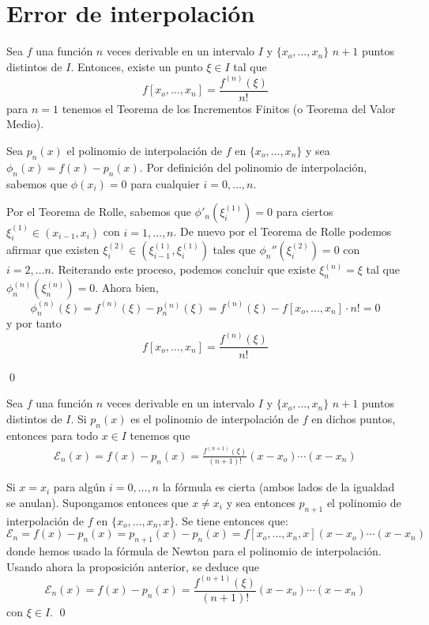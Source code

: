         \section{Error de interpolación}
        \begin{prop}
        Sea $f$ una función $n$ veces derivable en un intervalo $I$ y $\{x_o,\ldots,x_n\}$ $n+1$ puntos distintos de $I$. Entonces, existe un punto $\xi\in I$ tal que
        $$f[x_o,\ldots,x_n]=\frac{f^{(n)}(\xi)}{n!}$$
        para $n=1$ tenemos el Teorema de los Incrementos Finitos (o Teorema del Valor Medio).
        \end{prop}
        \begin{dem}
        Sea $p_n(x)$ el polinomio de interpolación de $f$ en $\{x_o,\ldots,x_n\}$ y sea $\phi_n(x)=f(x)-p_n(x)$. Por definición del polinomio de interpolación, sabemos que $\phi(x_i)=0$ para cualquier $i=0,\ldots,n$.
        
        Por el Teorema de Rolle, sabemos que $\phi'_n(\xi^{(1)}_i)=0$ para ciertos $\xi^{(1)}_i\in(x_{i-1},x_i)$ con $i=1,\ldots,n$. De nuevo por el Teorema de Rolle podemos afirmar que existen $\xi_i^{(2)}\in(\xi_{i-1}^{(1)},\xi_i^{(1)})$ tales que $\phi_n''(\xi_i^{(2)})=0$ con $i=2,\ldots n$. Reiterando este proceso, podemos concluir que existe $\xi^{(n)}_n=\xi$ tal que $\phi^{(n)}_n(\xi^{(n)}_n)=0$. Ahora bien, $$\phi^{(n)}_n(\xi)=f^{(n)}(\xi)-p^{(n)}_n(\xi)=f^{(n)}(\xi)-f[x_o,\ldots,x_n]\cdot n!=0$$
        y por tanto 
       $$f[x_o,\ldots,x_n]=\frac{f^{(n)}(\xi)}{n!}$$

        \qed\end{dem}
        \begin{teo}
         Sea $f$ una función $n$ veces derivable en un intervalo $I$ y $\{x_o,\ldots,x_n\}$ $n+1$ puntos distintos de $I$. Si $p_n(x)$ es el polinomio de interpolación de $f$ en dichos puntos, entonces para todo $x\in I$ tenemos que
         \begin{align}
         \mathcal{E}_n(x)=f(x)-p_n(x)=\frac{f^{(n+1)}(\xi)}{(n+1)!}(x-x_o)\cdots(x-x_n)
         \label{error:int}
          \end{align}
        \end{teo}
        \begin{dem}
        Si $x=x_i$ para algún $i=0,\ldots, n$ la fórmula es cierta (ambos lados de la igualdad se anulan). Supongamos entonces que $x\neq x_i$ y sea entonces $p_{n+1}$ el polinomio de interpolación de $f$ en $\{x_o,\ldots,x_n,x\}$. Se tiene entonces que:
        $$\mathcal{E}_n=f(x)-p_n(x)=p_{n+1}(x)-p_n(x)=f[x_o,\ldots,x_n,x](x-x_o)\cdots(x-x_n)$$
        donde hemos usado la fórmula de Newton para el polinomio de interpolación. Usando ahora la proposición anterior, se deduce que
        $$\mathcal{E}_n(x)=f(x)-p_n(x)=\frac{f^{(n+1)}(\xi)}{(n+1)!}(x-x_o)\cdots(x-x_n)$$
        con $\xi\in I$.
        \qed\end{dem}
